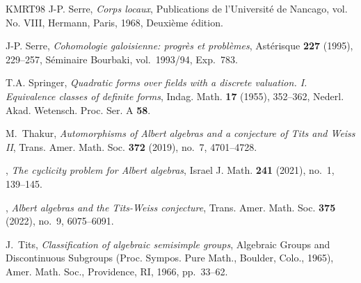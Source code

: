\documentclass{amsart}
\theoremstyle{definition} %
\theoremstyle{remark} %
\renewcommand{\:}{\colon\,}
\numberwithin{equation}{section}
\begin{document}
\begin{thebibliography}{KMRT98}
J-P. Serre, \emph{Corps locaux}, Publications de l'Universit\'e{} de Nancago, vol. No. VIII, Hermann, Paris, 1968, Deuxi\`eme \'edition. 

J-P. Serre, \emph{Cohomologie galoisienne: progr\`{e}s et probl\`{e}mes}, Ast\'erisque \textbf{227} (1995), 229--257, S\'eminaire Bourbaki, vol.\ 1993/94, Exp.\ 783.

T.A. Springer, \emph{Quadratic forms over fields with a discrete valuation. {I}. {E}quivalence classes of definite forms}, Indag. Math. \textbf{17} (1955), 352--362, Nederl. Akad. Wetensch. Proc. Ser. A {\bf 58}. 

M.~Thakur, \emph{Automorphisms of {A}lbert algebras and a conjecture of {T}its and {W}eiss {II}}, Trans. Amer. Math. Soc. \textbf{372} (2019), no.~7, 4701--4728. 

\bysame, \emph{The cyclicity problem for {A}lbert algebras}, Israel J. Math. \textbf{241} (2021), no.~1, 139--145. 

\bysame, \emph{Albert algebras and the {T}its-{W}eiss conjecture}, Trans. Amer. Math. Soc. \textbf{375} (2022), no.~9, 6075--6091. 

J.~Tits, \emph{Classification of algebraic semisimple groups}, Algebraic {G}roups and {D}iscontinuous {S}ubgroups ({P}roc. {S}ympos. {P}ure {M}ath., {B}oulder, {C}olo., 1965), Amer. Math. Soc., Providence, RI, 1966, pp.~33--62. 

\end{thebibliography}
%
\end{document}
